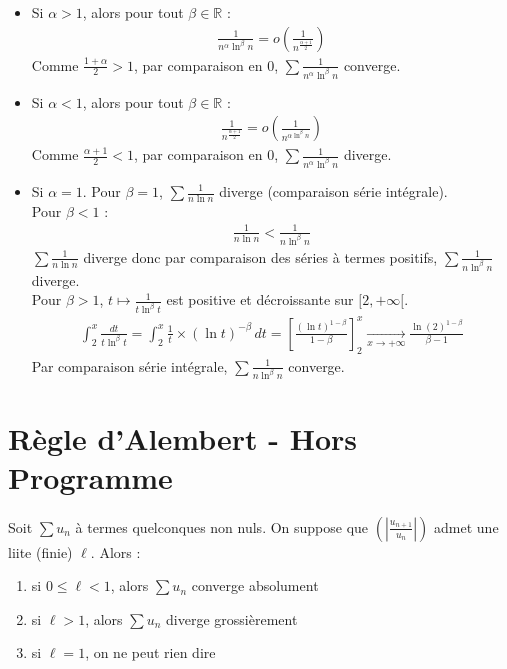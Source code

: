 \documentclass[../main.tex]{subfiles}
\begin{document}
\begin{itemize}
    \item Si $\alpha > 1$, alors pour tout $\beta\in \mathbb{R}$ : 
    \begin{align*}
        \frac{1}{n^{\alpha} \ln^{\beta} n} = o \left( \frac{1}{n^{\frac{\alpha + 1}{2}}} \right)
    \end{align*}
    Comme $\frac{1 + \alpha}{2} > 1$, par comparaison en $0$, $\sum \frac{1}{n^{\alpha} \ln^{\beta} n}$ converge.

    \item Si $\alpha < 1$, alors pour tout $\beta\in \mathbb{R}$ : 
    \begin{align*}
        \frac{1}{n^{\frac{\alpha + 1}{2}}} = o \left( \frac{1}{n^{\alpha \ln^{\beta} n}} \right)
    \end{align*}
    Comme $\frac{\alpha + 1}{2} < 1$, par comparaison en $0$, $\sum \frac{1}{n^{\alpha} \ln^{\beta} n}$ diverge.

    \item Si $\alpha = 1$. Pour $\beta = 1$, $\sum \frac{1}{n \ln n}$ diverge (comparaison série intégrale). \\
    Pour $\beta < 1$ : 
    \begin{align*}
        \frac{1}{n\ln n} < \frac{1}{n \ln^{\beta} n}
    \end{align*}
    $\sum \frac{1}{n\ln n}$ diverge donc par comparaison des séries à termes positifs, $\sum \frac{1}{n \ln^{\beta} n}$ diverge. \\
    Pour $\beta > 1$, $t\mapsto \frac{1}{t\ln^{\beta} t}$ est positive et décroissante sur $[2, +\infty[$. 
    \begin{align*}
        \int_{2}^{x} \frac{dt}{t\ln^{\beta} t} = \int_{2}^{x} \frac{1}{t} \times (\ln t)^{-\beta} \,dt = \left[ \frac{(\ln t)^{1 - \beta}}{1 - \beta} \right]_2^{x} \underset{x \to +\infty}{\longrightarrow} \frac{\ln(2)^{1 - \beta}}{\beta - 1}
    \end{align*}
    Par comparaison série intégrale, $\sum \frac{1}{n \ln^{\beta} n}$ converge. 
\end{itemize}

\section{Règle d'Alembert - Hors Programme}
\begin{tcolorbox}[title=Théorème 27.35 - HP, title filled=false, colframe=orange, colback=orange!10!white]
    Soit $\sum u_n$ à termes quelconques non nuls. On suppose que $\left( \left| \frac{u_{n+1}}{u_n} \right| \right)$ admet une liite (finie) $\ell$. Alors : 
    \begin{enumerate}
        \item si $0\leq \ell < 1$, alors $\sum u_n$ converge absolument
        \item si $\ell > 1$, alors $\sum u_n$ diverge grossièrement
        \item si $\ell = 1$, on ne peut rien dire
    \end{enumerate}
\end{tcolorbox}
\end{document}
